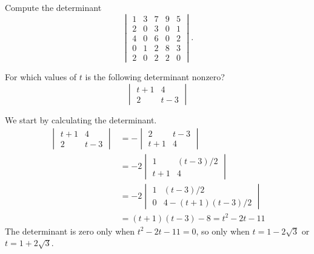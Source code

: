 \documentclass[12pt,a4paper]{article}
\theoremstyle{definition}
\begin{document}
\begin{question}
	Compute the determinant
	\[ \begin{vmatrix}
    	1 & 3 & 7 & 9 & 5 \\
    	2 & 0 & 3 & 0 & 1 \\
    	4 & 0 & 6 & 0 & 2 \\
    	0 & 1 & 2 & 8 & 3 \\
    	2 & 0 & 2 & 2 & 0 
    	\end{vmatrix}. \]
\end{question}

\begin{question}
For which values of $t$ is the following determinant nonzero?
$$\begin{vmatrix} t+1 & 4 \\ 2 & t-3\end{vmatrix}$$

\end{question}

\begin{solution}
We start by calculating the determinant. 
\begin{align*}
    \begin{vmatrix} t+1 & 4 \\ 2 & t-3\end{vmatrix} &= -\begin{vmatrix}  2 & t-3\\ t+1 & 4 \end{vmatrix}\\
    &= -2\begin{vmatrix}  1 & (t-3)/2\\ t+1 & 4 \end{vmatrix}\\
    &=-2\begin{vmatrix}  1 & (t-3)/2\\ 0 & 4-(t+1)(t-3)/2 \end{vmatrix}\\
    &=(t+1)(t-3)-8=t^2-2t-11
\end{align*}
The determinant is zero only when $t^2-2t-11=0$, so only when $t=1-2\sqrt{3}$ or $t=1+2\sqrt{3}$.
\end{solution}


\newpage
\end{document}
